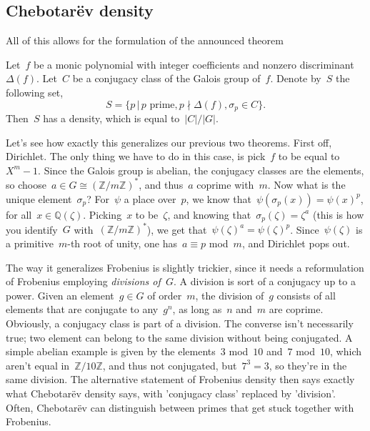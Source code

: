 \subsection{Chebotar\"ev density}

All of this allows for the formulation of the announced theorem
\begin{theorem}
  Let~$f$ be a monic polynomial with integer coefficients and nonzero discriminant~$\Delta(f)$. Let~$C$ be a conjugacy class of the Galois group of~$f$. Denote by~$S$ the following set,
  \begin{equation}
    S=\{ p\,|\, \text{$p$ prime}, p\nmid \Delta(f), \sigma_{p} \in C \}. 
  \end{equation}
  Then~$S$ has a density, which is equal to~$\vert C \vert / \vert G \vert$.
\end{theorem}

Let's see how exactly this generalizes our previous two theorems. First off, Dirichlet. The only thing we have to do in this case, is pick~$f$ to be equal to~$X^{m}-1$. Since the Galois group is abelian, the conjugacy classes are the elements, so choose~$a \in G \cong (\mathbb{Z}/m\mathbb{Z})^{*}$, and thus~$a$ coprime with~$m$. Now what is the unique element~$\sigma_{p}$? For~$\psi$ a place over~$p$, we know that~$\psi(\sigma_{p}(x))=\psi(x)^{p}$, for all~$x \in \mathbb{Q}(\zeta)$. Picking~$x$ to be~$\zeta$, and knowing that~$\sigma_{p}(\zeta)=\zeta^{a}$ (this is how you identify~$G$ with~$(\mathbb{Z}/m\mathbb{Z})^{*}$), we get that~$\psi(\zeta)^{a}=\psi(\zeta)^{p}$. Since~$\psi(\zeta)$ is a primitive~$m$-th root of unity, one has~$a \equiv p$ mod~$m$, and Dirichlet pops out.

The way it generalizes Frobenius is slightly trickier, since it needs a reformulation of Frobenius employing \emph{divisions of~$G$}. A division is sort of a conjugacy up to a power. Given an element~$g \in G$ of order~$m$, the division of~$g$ consists of all elements that are conjugate to any~$g^{n}$, as long as~$n$ and~$m$ are coprime. Obviously, a conjugacy class is part of a division. The converse isn't necessarily true; two element can belong to the same division without being conjugated. A simple abelian example is given by the elements~$3$ mod~$10$ and~$7$ mod~$10$, which aren't equal in~$\mathbb{Z}/10\mathbb{Z}$, and thus not conjugated, but~$7^{3}=3$, so they're in the same division. The alternative statement of Frobenius density then says exactly what Chebotar\"ev density says, with 'conjugacy class' replaced by 'division'. Often, Chebotar\"ev can distinguish between primes that get stuck together with Frobenius.

